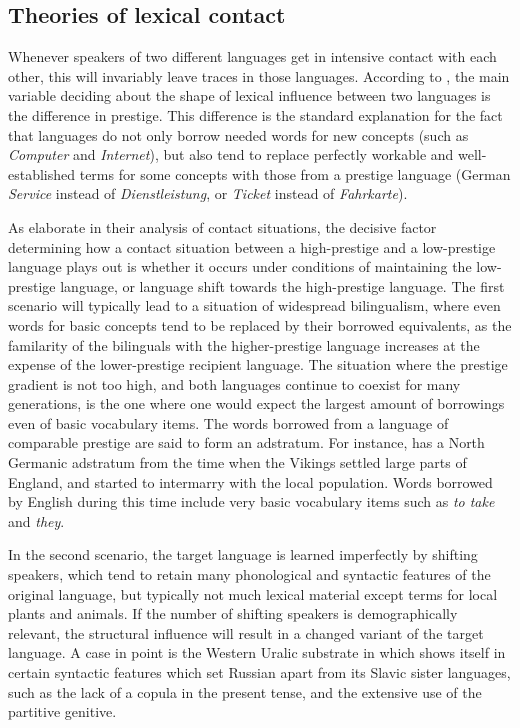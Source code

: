 \largerpage
\subsection{Theories of lexical contact}
Whenever speakers of two different languages get in intensive contact with each other, this will invariably leave traces in those languages. According to \citet[Section 8.5]{hock_joseph_1996}, the main variable deciding about the shape of lexical influence between two languages is the difference in prestige. This difference is the standard explanation for the fact that languages do not only borrow needed words for new concepts (such as  \textit{Computer} and \textit{Internet}), but also tend to replace perfectly workable and well-established terms for some concepts with those from a prestige language (German \textit{Service} instead of \textit{Dienstleistung}, or \textit{Ticket} instead of \textit{Fahrkarte}).

As \citet{thomason_kaufman_1988} elaborate in their analysis of contact situations, the decisive factor determining how a contact situation between a high-prestige and a low-prestige language plays out is whether it occurs under conditions of maintaining the low-prestige language, or language shift towards the high-prestige language. The first scenario will typically lead to a situation of widespread bilingualism, where even words for basic concepts tend to be replaced by their borrowed equivalents, as the familarity of the bilinguals with the higher-prestige language increases at the expense of the lower-prestige recipient language. The situation where the prestige gradient is not too high, and both languages continue to coexist for many generations, is the one where one would expect the largest amount of borrowings even of basic vocabulary items. The words borrowed from a language of comparable prestige are said to form an adstratum. For instance,  has a North Germanic 
adstratum from the time when the Vikings settled large parts of England, and started to intermarry with the local population. Words borrowed by English during this time include very basic vocabulary items such as \textit{to take} and \textit{they}.

In the second scenario, the target language is learned imperfectly by shifting speakers, which tend to retain many phonological and syntactic features of the original language, but typically not much lexical material except terms for local plants and animals. If the number of shifting speakers is demographically relevant, the structural  influence will result in a changed variant of the target language. A case in point is the Western Uralic substrate in  which shows itself in certain syntactic features which set Russian apart from its Slavic sister languages, such as the lack of a copula in the present tense, and the extensive use of the partitive genitive.

